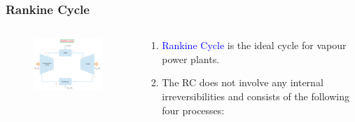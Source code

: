 \documentclass[10pt,compress,handout,ignorenonframetext]{beamer}
\begin{document}
\begin{frame}
\begin{columns}
\begin{column}[c]{0.5\linewidth}
{\begin{figure}
\begin{center}
           \end{center}
         \end{figure}}
      \end{column}
   \end{columns}
 \normalsize
\end{frame}





\begin{frame}
 \frametitle{Rankine Cycle}
 \begin{columns}
   \begin{column}[c]{0.6\linewidth}
    \begin{figure}%
     \begin{center}
      \includegraphics[width=7.5cm,clip]{./Pics/Simple_Rankine_Cycle}
     \end{center}
    \end{figure}  
   \end{column}
   \begin{column}[l]{0.4\linewidth}
    \begin{enumerate}
     \item <1->\textcolor{blue}{Rankine Cycle} is the ideal cycle for vapour power plants.
     \item <2-> The RC does not involve any internal irreversibilities and consists of the following four processes:
    \end{enumerate}
   \end{column}
  \end{columns}
 \normalsize
\end{frame}
\end{document}
